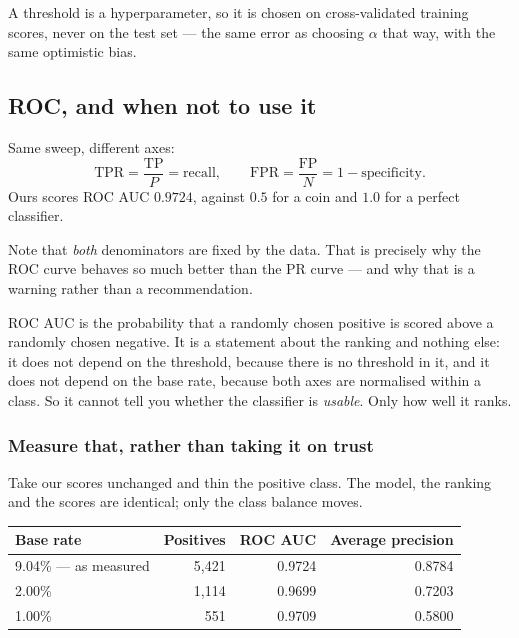 \documentclass[11pt,a4paper]{article}
\begin{document}
A threshold is a hyperparameter, so it is chosen on cross-validated training
scores, never on the test set --- the same error as choosing $\alpha$ that way,
with the same optimistic bias.

\subsection{ROC, and when not to use it}

Same sweep, different axes:
\[ \mathrm{TPR} = \frac{\mathrm{TP}}{P} = \text{recall},
   \qquad
   \mathrm{FPR} = \frac{\mathrm{FP}}{N} = 1 - \text{specificity}. \]
Ours scores ROC AUC $0.9724$, against $0.5$ for a coin and $1.0$ for a perfect
classifier.

Note that \emph{both} denominators are fixed by the data. That is precisely why
the ROC curve behaves so much better than the PR curve --- and why that is a
warning rather than a recommendation.

ROC AUC is the probability that a randomly chosen positive is scored above a
randomly chosen negative. It is a statement about the ranking and nothing else:
it does not depend on the threshold, because there is no threshold in it, and
it does not depend on the base rate, because both axes are normalised within a
class. So it cannot tell you whether the classifier is \emph{usable}. Only how
well it ranks.

\subsubsection{Measure that, rather than taking it on trust}

Take our scores unchanged and thin the positive class. The model, the ranking
and the scores are identical; only the class balance moves.

\begin{center}
\small
\begin{tabular}{lrrr}
\toprule
\textbf{Base rate} & \textbf{Positives} & \textbf{ROC AUC} &
\textbf{Average precision} \\
\midrule
9.04\% --- as measured & 5{,}421 & 0.9724 & 0.8784 \\
2.00\%                 & 1{,}114 & 0.9699 & 0.7203 \\
1.00\%                 &    551 & 0.9709 & 0.5800 \\
\bottomrule
\end{tabular}
\end{center}
\end{document}
